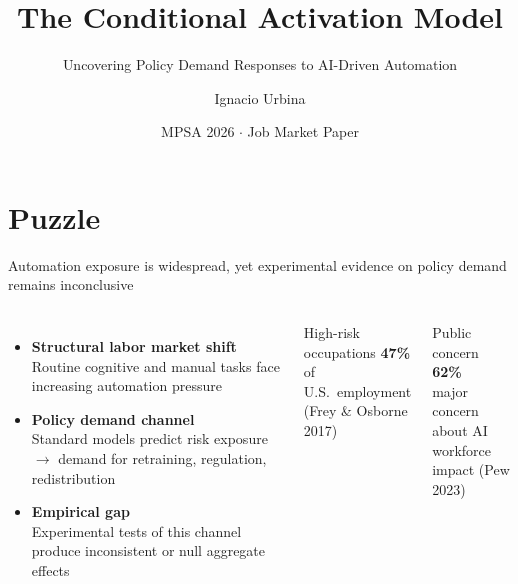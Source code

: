 \documentclass[aspectratio=169,11pt]{beamer}
\title{The Conditional Activation Model}
\subtitle{Uncovering Policy Demand Responses to AI-Driven Automation}
\author{Ignacio Urbina}
\institute{Stony Brook University}
\date{MPSA 2026 \(\cdot\) Job Market Paper}
\begin{document}
\begin{frame}
\titlepage
\end{frame}

\section{Puzzle}

\begin{frame}{Automation exposure is widespread, yet experimental evidence on policy demand remains inconclusive}

\begin{columns}[T]
\begin{itemize}
    \item \textbf{Structural labor market shift} \\
    {\small Routine cognitive and manual tasks face increasing automation pressure}
    \item \textbf{Policy demand channel} \\
    {\small Standard models predict risk exposure $\to$ demand for retraining, regulation, redistribution}
    \item \textbf{Empirical gap} \\
    {\small Experimental tests of this channel produce inconsistent or null aggregate effects}
\end{itemize}

\begin{block}{High-risk occupations}
\centering \textbf{\Large 47\%} \\
{\small of U.S.\ employment \\ (Frey \& Osborne 2017)}
\end{block}
\vspace{0.3cm}
\begin{block}{Public concern}
\centering \textbf{\Large 62\%} \\
{\small major concern about AI \\ workforce impact (Pew 2023)}
\end{block}
\end{columns}

\end{frame}
\end{document}
